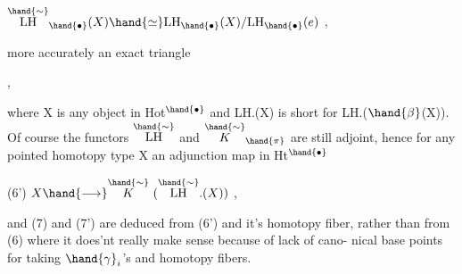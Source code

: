  \qquad $\overset{\hand{\sim}}{\mathrm{LH}}_{\hand{\bullet}}(X) \hand{\simeq} \mathrm{LH}_{\hand{\bullet}}(X)/\mathrm{LH}_{\hand{\bullet}}(e)$ \qquad ,

more accurately an exact triangle

   \qquad ,

where X is any object in Hot$^\hand{\bullet}$ and LH.(X) is short for LH.($\hand{\beta}$(X)). Of
course the functors $\overset{\hand{\sim}}{\mathrm{LH}}$ and $\overset{\hand{\sim}}{K}_{\hand{\pi}}$ are still adjoint, hence for any pointed
homotopy type X an adjunction map in Ht$^\hand{\bullet}$

(6') \qquad $X \hand{\longrightarrow} \overset{\hand{\sim}}{K}\ (\overset{\hand{\sim}}{\mathrm{LH}}.(X))$ \quad ,

and (7) and (7') are deduced from (6') and it's homotopy fiber, rather
than from (6) where it does'nt really make sense because of lack of cano-%
nical base points for taking $\hand{\gamma}_i$'s and homotopy fibers.


